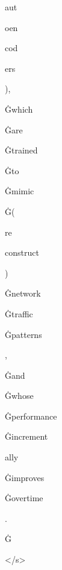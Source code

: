 \documentclass[varwidth]{standalone}
\begin{document}
\begin{CJK*}{UTF8}{gbsn}
{{{\colorbox{red!1.7537249}{\strut aut} \colorbox{red!1.4598026}{\strut oen} \colorbox{red!1.7919147}{\strut cod} \colorbox{red!1.4703358}{\strut ers} \colorbox{red!1.1812392}{\strut ),} \colorbox{red!1.0320668}{\strut Ġwhich} \colorbox{red!1.2479395}{\strut Ġare} \colorbox{red!2.7698393}{\strut Ġtrained} \colorbox{red!1.8799573}{\strut Ġto} \colorbox{red!1.2742883}{\strut Ġmimic} \colorbox{red!1.4199893}{\strut Ġ(} \colorbox{red!0.69246143}{\strut re} \colorbox{red!0.9156103}{\strut construct} \colorbox{red!1.0595975}{\strut )} \colorbox{red!2.1959982}{\strut Ġnetwork} \colorbox{red!1.4540446}{\strut Ġtraffic} \colorbox{red!1.0129191}{\strut Ġpatterns} \colorbox{red!0.52628505}{\strut ,} \colorbox{red!0.49874964}{\strut Ġand} \colorbox{red!1.0473279}{\strut Ġwhose} \colorbox{red!0.97545516}{\strut Ġperformance} \colorbox{red!0.21607962}{\strut Ġincrement} \colorbox{red!0.41500613}{\strut ally} \colorbox{red!0.7689819}{\strut Ġimproves} \colorbox{red!0.9337592}{\strut Ġovertime} \colorbox{red!44.539883}{\strut .} \colorbox{red!0.39759073}{\strut Ġ} \colorbox{red!0.5209802}{\strut </s>} 
}}}
\end{CJK*}
\end{document}
